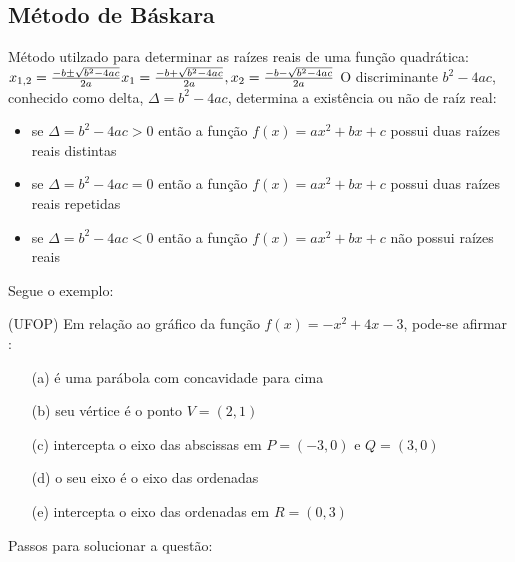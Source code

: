 \begin{multicols*}{2}
\begin{itemize}
              \subsection{Método de Báskara}
              Método utilzado para determinar as raízes reais de uma função quadrática:
              $
                  x_{1,2} = \frac{- b \pm \sqrt{b^2 - 4ac} }{2a} \\
                  x_1 = \frac{- b + \sqrt{b^2 - 4ac} }{2a} ,
                  x_2 = \frac{- b - \sqrt{b^2 - 4ac} }{2a}
              $
              O discriminante $b^2 - 4ac$, conhecido como delta, $\Delta = b^2 - 4ac$, determina a existência 		ou não de raíz real:
              \begin{itemize}
                  \item se $\Delta = b^2 - 4ac > 0 $ então a função $f(x) = ax^2 + bx + c$ possui duas raízes 			reais distintas
                  \item se $\Delta = b^2 - 4ac = 0 $ então a função $f(x) = ax^2 + bx + c$ possui duas raízes 			reais repetidas
                  \item se $\Delta = b^2 - 4ac < 0 $  então a função $f(x) = ax^2 + bx + c$ não possui raízes 			reais
              \end{itemize}
    \end{itemize}
    Segue o exemplo:

    (UFOP) Em relação ao gráfico da função $f(x) = -x^2 + 4x -3$, pode-se afirmar :
    \begin{itemize}
        \item[(a)]é uma parábola com concavidade para cima
        \item[(b)]seu vértice é o ponto $V = (2,1)$
        \item[(c)] intercepta o eixo das abscissas em  $P = (-3,0)$ e $Q = (3,0)$
        \item[(d)]o seu eixo é o eixo das ordenadas
        \item[(e)]intercepta o eixo das ordenadas em $R = (0,3)$
    \end{itemize}
    Passos para solucionar a questão:


\end{multicols*}
